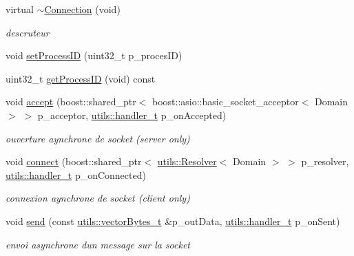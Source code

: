 \begin{DoxyCompactItemize}
\item 
virtual \hyperlink{classxtd_1_1network_1_1base_1_1Connection_a51f309c311421eb6a378354914816fac}{$\sim$\+Connection} (void)
\begin{DoxyCompactList}\small\item\em descruteur \end{DoxyCompactList}\item 
void \hyperlink{classxtd_1_1network_1_1base_1_1Connection_ad5e705dc3bc5dd4e020c8caf450aab80}{set\+Process\+ID} (uint32\+\_\+t p\+\_\+proces\+ID)
\item 
uint32\+\_\+t \hyperlink{classxtd_1_1network_1_1base_1_1Connection_a5cc120a87112e3923ffc01b341ace70b}{get\+Process\+ID} (void) const 
\item 
void \hyperlink{classxtd_1_1network_1_1base_1_1Connection_af8da803db4caa1f125548508cf3db134}{accept} (boost\+::shared\+\_\+ptr$<$ boost\+::asio\+::basic\+\_\+socket\+\_\+acceptor$<$ Domain $>$ $>$ p\+\_\+acceptor, \hyperlink{namespacextd_1_1network_1_1utils_ac8a6f796cd645f83cde023d163665bb5}{utils\+::handler\+\_\+t} p\+\_\+on\+Accepted)
\begin{DoxyCompactList}\small\item\em ouverture aynchrone de socket (server only) \end{DoxyCompactList}\item 
void \hyperlink{classxtd_1_1network_1_1base_1_1Connection_a408b83f0e43d18e32f31d6c13d6dcdf3}{connect} (boost\+::shared\+\_\+ptr$<$ \hyperlink{classxtd_1_1network_1_1utils_1_1Resolver}{utils\+::\+Resolver}$<$ Domain $>$ $>$ p\+\_\+resolver, \hyperlink{namespacextd_1_1network_1_1utils_ac8a6f796cd645f83cde023d163665bb5}{utils\+::handler\+\_\+t} p\+\_\+on\+Connected)
\begin{DoxyCompactList}\small\item\em connexion aynchrone de socket (client only) \end{DoxyCompactList}\item 
void \hyperlink{classxtd_1_1network_1_1base_1_1Connection_a8ebc5958cf7d27a902bd75a55c4648bf}{send} (const \hyperlink{namespacextd_1_1network_1_1utils_a9fedf0d18549b8034e9ae347955e9a9a}{utils\+::vector\+Bytes\+\_\+t} \&p\+\_\+out\+Data, \hyperlink{namespacextd_1_1network_1_1utils_ac8a6f796cd645f83cde023d163665bb5}{utils\+::handler\+\_\+t} p\+\_\+on\+Sent)
\begin{DoxyCompactList}\small\item\em envoi asynchrone d\textquotesingle{}un message sur la socket \end{DoxyCompactList}\item 

\end{DoxyCompactItemize}
